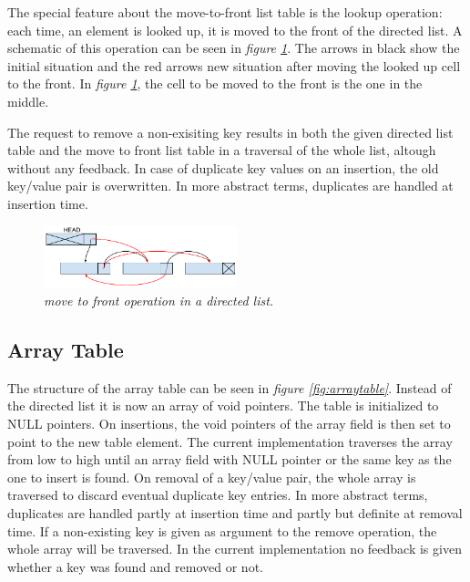 \documentclass[a4paper,11pt,twoside]{article}
\begin{document}
The special feature about the move-to-front list table is the lookup
operation: each time, an element is looked up, it is moved to the
front of the directed list. A schematic of this operation can be seen
in \textit{figure \ref{fig:movetofront}}. The arrows in black show the
initial situation and the red arrows new situation after moving the
looked up cell to the front. In \textit{figure \ref{fig:movetofront}},
the cell to be moved to the front is the one in the middle.

The request to remove a non-exisiting key results in both the given
directed list table and the move to front list table in a traversal 
of the whole list, altough without any feedback. In case of duplicate
key values on an insertion, the old key/value pair is overwritten. In
more abstract terms, duplicates are handled at insertion time. 

\begin{figure}[H]
\centering
\includegraphics[width=0.5\textwidth]{figures/movetofront.pdf}
\caption{\textit{move to front operation in a directed list.}}
\label{fig:movetofront}
\end{figure}



\subsection{Array Table}
The structure of the array table can be seen in \textit{figure
  \ref{fig:arraytable}}. Instead of the directed list it is now
an array of void pointers. The table is initialized to NULL
pointers. On insertions, the void pointers of the array field is then
set to point to the new table element. The current implementation
traverses the array from low to high until an array field with NULL
pointer or the same key as the one to insert is found. On removal
of a key/value pair, the whole array is traversed to discard eventual
duplicate key entries. In more abstract terms, duplicates are handled
partly at insertion time and partly but definite at removal time. 
If a non-existing key is given as argument to
the remove operation, the whole array will be traversed. In the
current implementation no feedback is given whether a key was found
and removed or not.   
\end{document}
